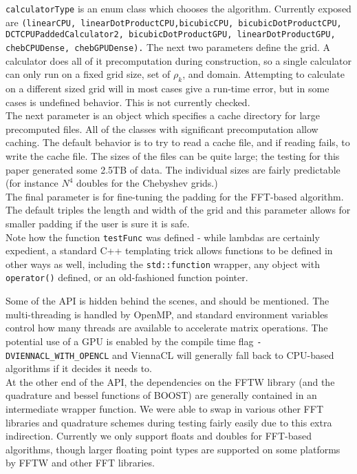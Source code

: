 \texttt{calculatorType} is an enum class which chooses the algorithm.  Currently exposed are \texttt{(linearCPU, linearDotProductCPU,bicubicCPU, bicubicDotProductCPU, 	DCTCPUPaddedCalculator2, bicubicDotProductGPU, linearDotProductGPU, chebCPUDense,  chebGPUDense).}
The next two parameters define the grid.  A calculator does all of it precomputation during construction, so a single calculator can only run on a fixed grid size, set of $\rho_k$, and domain.  Attempting to calculate on a different sized grid will in most cases give a run-time error, but in some cases is undefined behavior.  This is not currently checked.\\

The next parameter is an object which specifies a cache directory for large precomputed files.  All of the classes with significant precomputation allow caching.  The default behavior is to try to read a cache file, and if reading fails, to write the cache file.  The sizes of the files can be quite large; the testing for this paper generated some 2.5TB of data.  The individual sizes are fairly predictable (for instance $N^4$ doubles for the Chebyshev grids.) \\


The final parameter is for fine-tuning the padding for the FFT-based algorithm.  The default triples the length and width of the grid and this parameter allows for smaller padding if the user is sure it is safe.   \\

Note how the function \texttt{testFunc} was defined - while lambdas are certainly expedient, a standard C++ templating trick allows functions to be defined in other ways as well, including the \texttt{std::function} wrapper, any object with \texttt{operator()} defined, or an old-fashioned function pointer.  

Some of the API is hidden behind the scenes, and should be mentioned.  The multi-threading is handled by OpenMP, and standard environment variables control how many threads are available to accelerate matrix operations.  The potential use of a GPU is enabled by the compile time flag  \texttt{-DVIENNACL_WITH_OPENCL} and ViennaCL will generally fall back to CPU-based algorithms if it decides it needs to.  \\

At the other end of the API, the dependencies on the FFTW library (and the quadrature and bessel functions of BOOST) are generally contained in an intermediate wrapper function.  We were able to swap in various other FFT libraries and quadrature schemes during testing fairly easily due to this extra indirection.  Currently we only support floats and doubles for FFT-based algorithms, though larger floating point types are supported on some platforms by FFTW and other FFT libraries.


